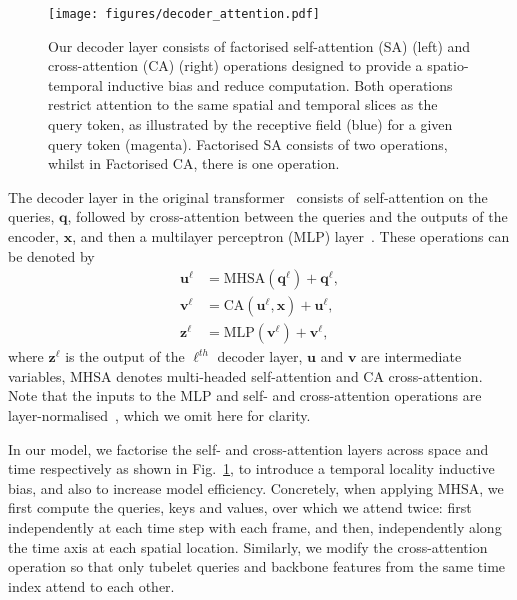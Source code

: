 \documentclass[10pt,twocolumn,letterpaper]{article}
\begin{document}
\begin{figure}[t]
	\vspace{-0.5\baselineskip}
	\texttt{[image: figures/decoder\_attention.pdf]}
	\caption{
		Our decoder layer consists of factorised self-attention (SA) (left) and cross-attention (CA) (right) operations designed to provide a spatio-temporal inductive bias and reduce computation. Both operations restrict attention to the same spatial and temporal slices as the query token, as illustrated by the receptive field (blue) for a given query token (magenta).
		Factorised SA consists of two operations, whilst in Factorised CA, there is one operation.
	}
	\vspace{-\baselineskip}
	\label{fig:model_decoder}
\end{figure} 
The decoder layer in the original transformer~\cite{vaswani_neurips_2017} consists of self-attention on the queries, $\mathbf{q}$, followed by cross-attention between the queries and the outputs of the encoder, $\mathbf{x}$, and then a multilayer perceptron (MLP) layer~\cite{vaswani_neurips_2017, hendrycks_arxiv_2016}.
These operations can be denoted by
\begin{align}
	\mathbf{u}^{\ell} &= \text{MHSA}(\mathbf{q}^{\ell}) + \mathbf{q}^{\ell}, \\
	\mathbf{v}^{\ell} &= \text{CA}(\mathbf{u}^{\ell}, \mathbf{x}) + \mathbf{u}^{\ell}, \\
	\mathbf{z}^{\ell} &= \text{MLP}(\mathbf{v}^{\ell}) + \mathbf{v}^{\ell},
\end{align}
where $\mathbf{z}^{\ell}$ is the output of the $\ell^{th}$ decoder layer, $\mathbf{u}$ and $\mathbf{v}$ are intermediate variables, $\text{MHSA}$ denotes multi-headed self-attention and $\text{CA}$ cross-attention.  Note that the inputs to the MLP and self- and cross-attention operations are layer-normalised~\cite{ba_arxiv_2016}, which we omit here for clarity. 

In our model, we factorise the self- and cross-attention layers across space and time respectively as shown in Fig.~\ref{fig:model_decoder}, to introduce a temporal locality inductive bias, and also to increase model efficiency.
Concretely, when applying $\text{MHSA}$, we first compute the queries, keys and values, over which we attend twice: first independently at each time step with each frame, and then, independently along the time axis at each spatial location.
Similarly, we modify the cross-attention operation so that only tubelet queries and backbone features from the same time index attend to each other.
\end{document}
